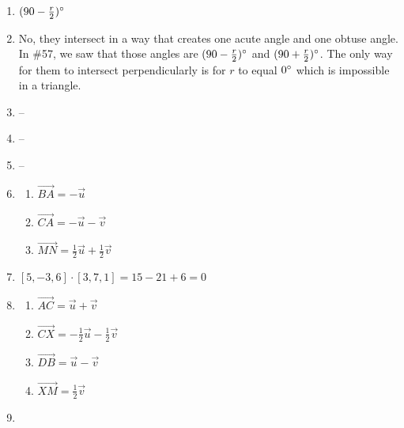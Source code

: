 \documentclass{article}
\begin{document}
\begin{enumerate}
\item $(90 - \frac{r}{2}) \degree$

\item No, they intersect in a way that creates one acute angle and one obtuse angle. In \#57, we saw that those angles are $(90 - \frac{r}{2}) \degree$ and $(90 + \frac{r}{2}) \degree$. The only way for them to intersect perpendicularly is for $r$ to equal $0 \degree$ which is impossible in a triangle.

\item --

\item --

\item --

\item

	\begin{enumerate}
	
	\item $\overrightarrow{BA} = -\vec{u}$
	
	\item $\overrightarrow{CA} = -\vec{u} - \vec{v}$
	
	\item $\overrightarrow{MN} = \frac{1}{2} \vec{u} + \frac{1}{2} \vec{v}$
	
	\end{enumerate}
	
\item $[5, -3, 6] \cdot [3, 7, 1] = 15 - 21 + 6 = 0$

\item

	\begin{enumerate}
	
	\item $\overrightarrow{AC} = \vec{u} + \vec{v}$
	
	\item $\overrightarrow{CX} = -\frac{1}{2} \vec{u} - \frac{1}{2} \vec{v}$
	
	\item $\overrightarrow{DB} = \vec{u} - \vec{v}$
	
	\item $\overrightarrow{XM} = \frac{1}{2}\vec{v}$
	
	\end{enumerate}
	
\item

	\begin{enumerate}
	

\end{enumerate}
\end{enumerate}
\end{document}
